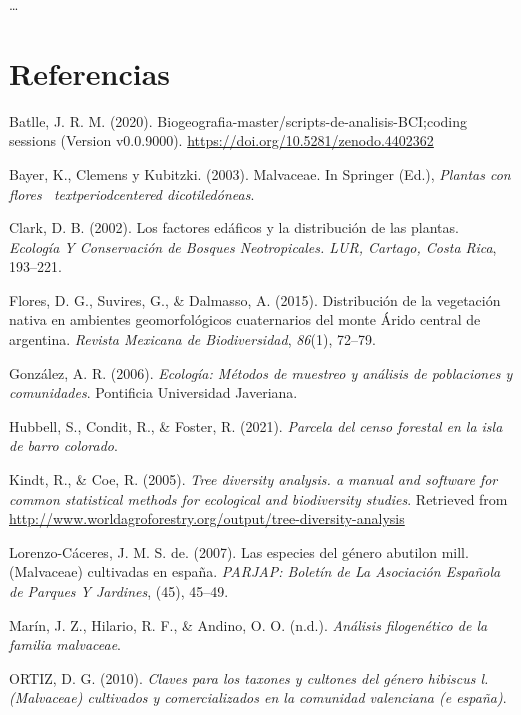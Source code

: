 \documentclass[11pt,]{article}
\begin{document}
\ldots

\section*{Referencias}\label{referencias}

\hypertarget{refs}{}
\hypertarget{ref-jose_ramon_martinez_batlle_2020_4402362}{}
Batlle, J. R. M. (2020).
Biogeografia-master/scripts-de-analisis-BCI;coding sessions (Version
v0.0.9000). \url{https://doi.org/10.5281/zenodo.4402362}

\hypertarget{ref-bayer2003malvaceae}{}
Bayer, K., Clemens y Kubitzki. (2003). Malvaceae. In Springer (Ed.),
\emph{Plantas con flores ~textperiodcentered dicotiledóneas}.

\hypertarget{ref-clark2002factores}{}
Clark, D. B. (2002). Los factores edáficos y la distribución de las
plantas. \emph{Ecología Y Conservación de Bosques Neotropicales. LUR,
Cartago, Costa Rica}, 193--221.

\hypertarget{ref-flores2015distribucion}{}
Flores, D. G., Suvires, G., \& Dalmasso, A. (2015). Distribución de la
vegetación nativa en ambientes geomorfológicos cuaternarios del monte
Árido central de argentina. \emph{Revista Mexicana de Biodiversidad},
\emph{86}(1), 72--79.

\hypertarget{ref-gonzalez2006ecologia}{}
González, A. R. (2006). \emph{Ecología: Métodos de muestreo y análisis
de poblaciones y comunidades}. Pontificia Universidad Javeriana.

\hypertarget{ref-webcenso}{}
Hubbell, S., Condit, R., \& Foster, R. (2021). \emph{Parcela del censo
forestal en la isla de barro colorado}.

\hypertarget{ref-biodiversidad}{}
Kindt, R., \& Coe, R. (2005). \emph{Tree diversity analysis. a manual
and software for common statistical methods for ecological and
biodiversity studies}. Retrieved from
\url{http://www.worldagroforestry.org/output/tree-diversity-analysis}

\hypertarget{ref-de2007especies}{}
Lorenzo-Cáceres, J. M. S. de. (2007). Las especies del género abutilon
mill.(Malvaceae) cultivadas en españa. \emph{PARJAP: Boletín de La
Asociación Española de Parques Y Jardines}, (45), 45--49.

\hypertarget{ref-marinanalisis}{}
Marín, J. Z., Hilario, R. F., \& Andino, O. O. (n.d.). \emph{Análisis
filogenético de la familia malvaceae}.

\hypertarget{ref-ortizclaves}{}
ORTIZ, D. G. (2010). \emph{Claves para los taxones y cultones del género
hibiscus l.(Malvaceae) cultivados y comercializados en la comunidad
valenciana (e españa)}.
\end{document}
